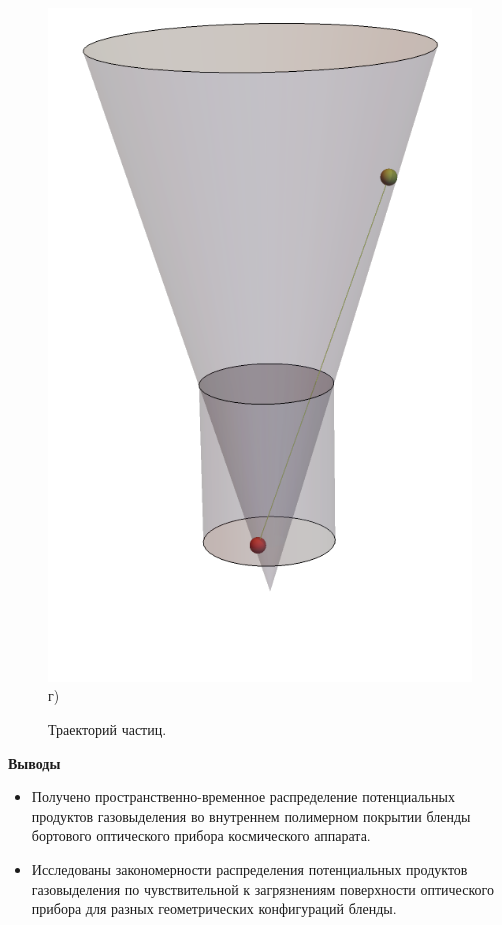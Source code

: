 \documentclass[
11pt,
master, %
subf, %
href, %
colorlinks=true, %
]{disser}
\begin{document}
\begin{figure}[h!]
\begin{minipage}[h]{0.4\linewidth}
		\includegraphics[width=1\linewidth]{vis4} \\ г)
	\end{minipage}
	\caption{Траекторий частиц.}
	\label{ris:7}
\end{figure}

\newpage
\textbf{Выводы}
\begin{itemize}
	\item Получено пространственно-временное распределение потенциальных продуктов газовыделения во внутреннем полимерном покрытии бленды бортового оптического прибора космического аппарата.
	\item Исследованы закономерности распределения потенциальных продуктов газовыделения по чувствительной к загрязнениям поверхности  оптического прибора для разных геометрических конфигураций бленды.
\end{itemize}

\let\BibEmph=\emph


\end{document}
